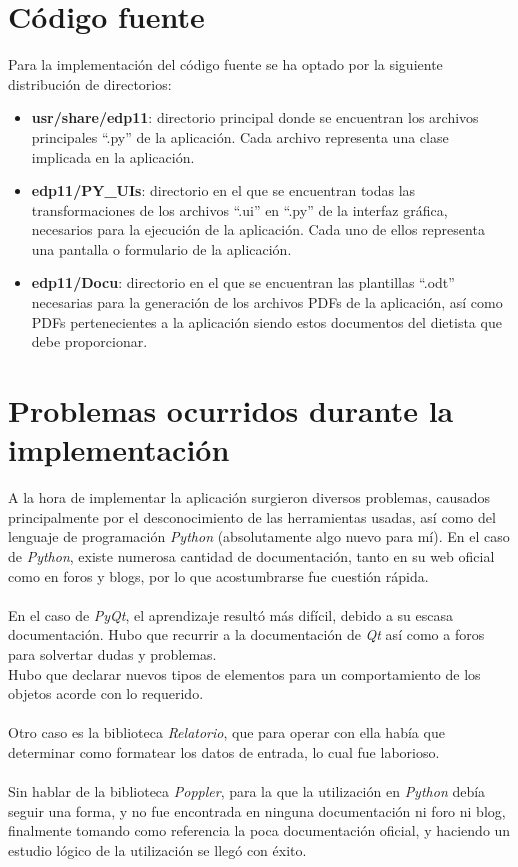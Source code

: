 \section{Código fuente}
Para la implementación del código fuente se ha optado por la siguiente distribución de directorios:
\begin{itemize}
\item \textbf{usr/share/edp11}: directorio principal donde se encuentran los archivos principales ``.py'' de la aplicación. Cada archivo representa una clase implicada en la aplicación.
\item \textbf{edp11/PY\_UIs}: directorio en el que se encuentran todas las transformaciones de los archivos ``.ui'' en ``.py'' de la interfaz gráfica, necesarios para la ejecución de la aplicación. Cada uno de ellos representa una pantalla o formulario de la aplicación.
\item \textbf{edp11/Docu}: directorio en el que se encuentran las plantillas ``.odt'' necesarias para la generación de los archivos PDFs de la aplicación, así como PDFs pertenecientes a la aplicación siendo estos documentos del dietista que debe proporcionar.
\end{itemize}


\section{Problemas ocurridos durante la implementación}
A la hora de implementar la aplicación surgieron diversos problemas, causados principalmente por el desconocimiento de las herramientas usadas, así como del lenguaje de programación \textit{Python} (absolutamente algo nuevo para mí). En el caso de \textit{Python}, existe numerosa cantidad de documentación, tanto en su web oficial como en foros y blogs, por lo que acostumbrarse fue cuestión rápida.\\\\
En el caso de \textit{PyQt}, el aprendizaje resultó más difícil, debido a su escasa documentación. Hubo que recurrir a la documentación de \textit{Qt} así como a foros para solvertar dudas y problemas. \\
Hubo que declarar nuevos tipos de elementos para un comportamiento de los objetos acorde con lo requerido.\\\\
Otro caso es la biblioteca \textit{Relatorio}, que para operar con ella había que determinar como formatear los datos de entrada, lo cual fue laborioso.\\\\
Sin hablar de la biblioteca \textit{Poppler}, para la que la utilización en \textit{Python} debía seguir una forma, y no fue encontrada en ninguna documentación ni foro ni blog, finalmente tomando como referencia la poca documentación oficial, y haciendo un estudio lógico de la utilización se llegó con éxito.











